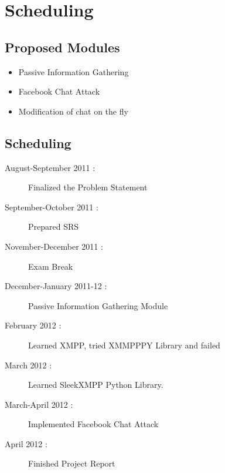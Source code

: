 \chapter{Scheduling}


\section{Proposed Modules}

\begin{itemize}
\item{Passive Information Gathering}
\item{Facebook Chat Attack}
\item{Modification of chat on the fly}
\end{itemize}

\section{Scheduling}

\begin{description}
\item[August-September 2011 : ] Finalized the Problem Statement
\item[September-October 2011 : ] Prepared SRS
\item[November-December 2011 : ] Exam Break
\item[December-January 2011-12 : ] Passive Information Gathering Module
\item[February 2012 : ] Learned XMPP, tried XMMPPPY Library and failed
\item[March 2012 : ] Learned SleekXMPP Python Library.
\item[March-April 2012 : ] Implemented Facebook Chat Attack
\item[April 2012 : ] Finished Project Report
\end{description}
